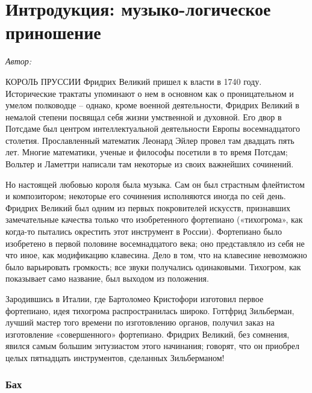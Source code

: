 \documentclass[../main.tex]{subfiles}
\begin{document}


\chapter*{Интродукция: музыко-логическое приношение}

\emph{Автор:}

КОРОЛЬ ПРУССИИ Фридрих Великий пришел к власти в 1740 году. Исторические трактаты упоминают о нем в основном как о проницательном и умелом полководце \--- однако, кроме военной деятельности, Фридрих Великий в немалой степени посвящал себя жизни умственной и духовной. Его двор в Потсдаме был центром интеллектуальной деятельности Европы восемнадцатого столетия. Прославленный математик Леонард Эйлер провел там двадцать пять лет. Многие математики, ученые и философы посетили в то время Потсдам; Вольтер и Ламеттри написали там некоторые из своих важнейших сочинений.

Но настоящей любовью короля была музыка. Сам он был страстным флейтистом и композитором; некоторые его сочинения исполняются иногда по сей день. Фридрих Великий был одним из первых покровителей искусств, признавших замечательные качества только что изобретенного фортепиано («тихогрома», как когда-то пытались окрестить этот инструмент в России). Фортепиано было изобретено в первой половине восемнадцатого века; оно представляло из себя не что иное, как модификацию клавесина. Дело в том, что на клавесине невозможно было варьировать громкость; все звуки получались одинаковыми. Тихогром, как показывает само название, был выходом из положения.

Зародившись в Италии, где Бартоломео Кристофори изготовил первое фортепиано, идея тихогрома распространилась широко. Готтфрид Зильберман, лучший мастер того времени по изготовлению органов, получил заказ на изготовление «совершенного» фортепиано. Фридрих Великий, без сомнения, явился самым большим энтузиастом этого начинания; говорят, что он приобрел целых пятнадцать инструментов, сделанных Зильберманом!


\subsection{Бах}
\end{document}
